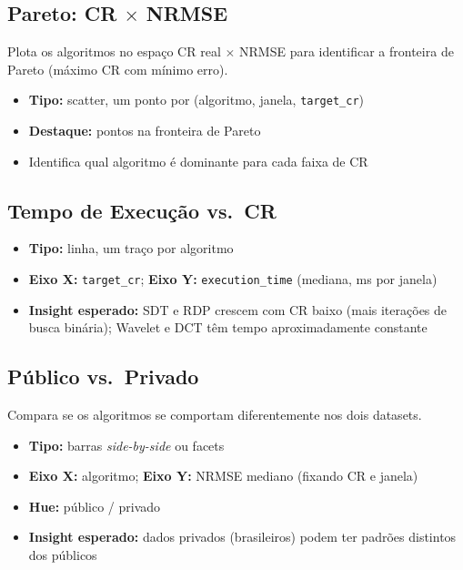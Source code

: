 \documentclass[12pt, a4paper]{article}
\begin{document}
\subsection{Pareto: CR $\times$ NRMSE}

Plota os algoritmos no espaço CR real $\times$ NRMSE para identificar a fronteira de Pareto (máximo CR com mínimo erro).

\begin{itemize}
    \item \textbf{Tipo:} scatter, um ponto por (algoritmo, janela, \texttt{target\_cr})
    \item \textbf{Destaque:} pontos na fronteira de Pareto
    \item Identifica qual algoritmo é dominante para cada faixa de CR
\end{itemize}

\subsection{Tempo de Execução vs.\ CR}

\begin{itemize}
    \item \textbf{Tipo:} linha, um traço por algoritmo
    \item \textbf{Eixo X:} \texttt{target\_cr}; \textbf{Eixo Y:} \texttt{execution\_time} (mediana, ms por janela)
    \item \textbf{Insight esperado:} SDT e RDP crescem com CR baixo (mais iterações de busca binária); Wavelet e DCT têm tempo aproximadamente constante
\end{itemize}

\subsection{Público vs.\ Privado}

Compara se os algoritmos se comportam diferentemente nos dois datasets.

\begin{itemize}
    \item \textbf{Tipo:} barras \textit{side-by-side} ou facets
    \item \textbf{Eixo X:} algoritmo; \textbf{Eixo Y:} NRMSE mediano (fixando CR e janela)
    \item \textbf{Hue:} público / privado
    \item \textbf{Insight esperado:} dados privados (brasileiros) podem ter padrões distintos dos públicos
\end{itemize}
\end{document}
